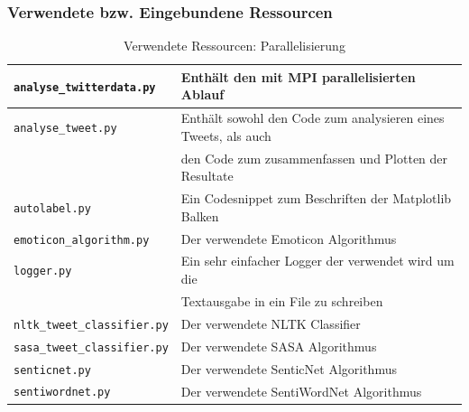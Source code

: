 \subsubsection{Verwendete bzw. Eingebundene Ressourcen}
\begin{table}[H]
\begin{center}
\begin{tabular}{|l|l|}
	\hline
	\lstinline$analyse_twitterdata.py$ & Enthält den mit MPI parallelisierten Ablauf\\ \hline
	\lstinline$analyse_tweet.py$ & Enthält sowohl den Code zum analysieren eines Tweets, als auch\\
	& den Code zum zusammenfassen und Plotten der Resultate\\ \hline
	\lstinline$autolabel.py$ & Ein Codesnippet zum Beschriften der Matplotlib Balken\\ \hline
	\lstinline$emoticon_algorithm.py$ & Der verwendete Emoticon Algorithmus\\ \hline
	\lstinline$logger.py$ & Ein sehr einfacher Logger der verwendet wird um die \\
	& Textausgabe in ein File zu schreiben\\ \hline
	\lstinline$nltk_tweet_classifier.py$ & Der verwendete NLTK Classifier\\ \hline
	\lstinline$sasa_tweet_classifier.py$ & Der verwendete SASA Algorithmus\\ \hline
	\lstinline$senticnet.py$ & Der verwendete SenticNet Algorithmus\\ \hline
	\lstinline$sentiwordnet.py$ & Der verwendete SentiWordNet Algorithmus\\ \hline
\end{tabular}
\caption{Verwendete Ressourcen: Parallelisierung}
\end{center}
\end{table}